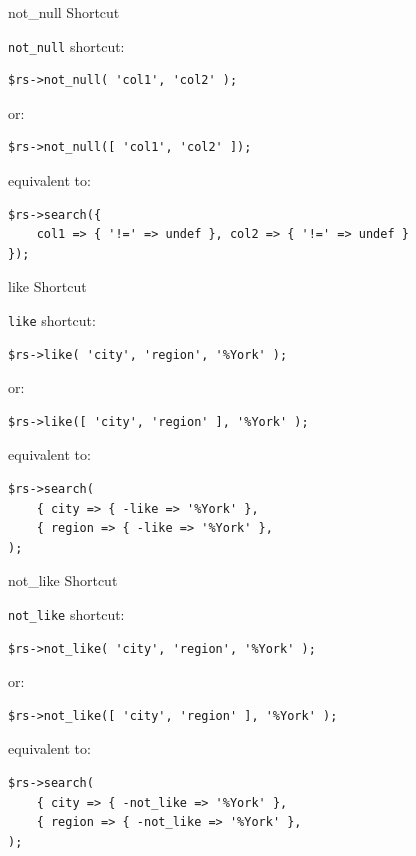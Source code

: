 \begin{frame}[fragile]{not\_null Shortcut}

\verb|not_null| shortcut:

\begin{lstlisting}
$rs->not_null( 'col1', 'col2' );
\end{lstlisting}

or:

\begin{lstlisting}
$rs->not_null([ 'col1', 'col2' ]);
\end{lstlisting}

equivalent to:

\begin{lstlisting}
$rs->search({
    col1 => { '!=' => undef }, col2 => { '!=' => undef }
});
\end{lstlisting}
\end{frame}


\begin{frame}[fragile]{like Shortcut}

\verb|like| shortcut:

\begin{lstlisting}
$rs->like( 'city', 'region', '%York' );
\end{lstlisting}

or:

\begin{lstlisting}
$rs->like([ 'city', 'region' ], '%York' );
\end{lstlisting}

equivalent to:

\begin{lstlisting}
$rs->search(
    { city => { -like => '%York' },
    { region => { -like => '%York' },
);
\end{lstlisting}
\end{frame}


\begin{frame}[fragile]{not\_like Shortcut}

\verb|not_like| shortcut:

\begin{lstlisting}
$rs->not_like( 'city', 'region', '%York' );
\end{lstlisting}

or:

\begin{lstlisting}
$rs->not_like([ 'city', 'region' ], '%York' );
\end{lstlisting}

equivalent to:

\begin{lstlisting}
$rs->search(
    { city => { -not_like => '%York' },
    { region => { -not_like => '%York' },
);

\end{lstlisting}
\end{frame}

